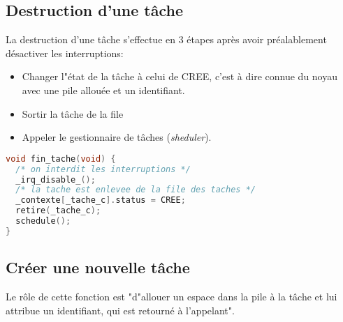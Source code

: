 \documentclass{article}
\begin{document}
\subsection{Destruction d'une tâche}
La destruction d'une tâche s'effectue en 3 étapes après avoir préalablement désactiver les interruptions:
\begin{itemize}
    \item Changer l"état de la tâche à celui de CREE, c'est à dire connue du noyau avec une pile allouée et un identifiant.
    \item Sortir la tâche de la file
    \item Appeler le gestionnaire de tâches (\textit{sheduler}).
\end{itemize}
\begin{lstlisting}[language=C, caption=noyau.c]
void fin_tache(void) {
  /* on interdit les interruptions */
  _irq_disable_();
  /* la tache est enlevee de la file des taches */
  _contexte[_tache_c].status = CREE;
  retire(_tache_c);
  schedule();
}
\end{lstlisting}

\subsection{Créer une nouvelle tâche}
Le rôle de cette fonction est "d"allouer un espace dans la pile à la tâche et lui attribue un identifiant, qui est retourné à l’appelant".
\end{document}
